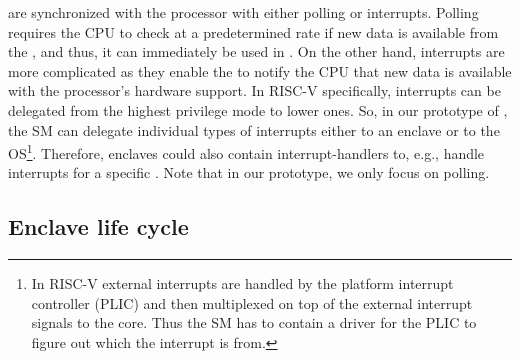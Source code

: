%      



\sphw are synchronized with the processor with either polling or interrupts. Polling requires the CPU to check at a predetermined rate if new data is available from the \sphw, and thus, it can immediately be used in \name{}. On the other hand, interrupts are more complicated as they enable the \sphw to notify the CPU that new data is available with the processor's hardware support. In RISC-V specifically, interrupts can be delegated from the highest privilege mode to lower ones. So, in our prototype of \name{}, the SM can delegate individual types of interrupts either to an enclave or to the OS\footnote{In RISC-V external interrupts are handled by the platform interrupt controller (PLIC) and then multiplexed on top of the external interrupt signals to the core. Thus the SM has to contain a driver for the PLIC to figure out which \sphw the interrupt is from.}. Therefore, enclaves could also contain interrupt-handlers to, e.g., handle interrupts for a specific \sphw. Note that in our prototype, we only focus on polling. 

\subsection{Enclave life cycle}
\label{sec:lifeycle}

